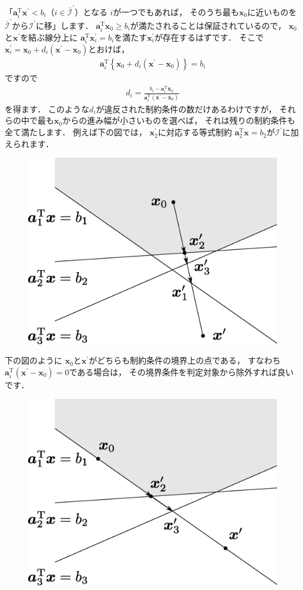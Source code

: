 ﻿\documentclass{jsarticle}
\begin{document}
「$\boldsymbol{a}_{i}^{\mathrm{T}}\boldsymbol{x}^{\prime}<b_{i}$（$i\in\bar{\mathcal{I}}^{\prime}$）となる
$i$が一つでもあれば，
そのうち最も$\boldsymbol{x}_{0}$に近いものを$\bar{\mathcal{I}}^{\prime}$から$\mathcal{I}^{\prime}$に移」します．
$\boldsymbol{a}_{i}^{\mathrm{T}}\boldsymbol{x}_{0}\geq b_{i}$が満たされることは保証されているので，
$\boldsymbol{x}_{0}$と$\boldsymbol{x}^{\prime}$を結ぶ線分上に
$\boldsymbol{a}_{i}^{\mathrm{T}}\boldsymbol{x}_{i}^{\prime}=b_{i}$を満たす$\boldsymbol{x}_{i}^{\prime}$が存在するはずです．
そこで
$\boldsymbol{x}_{i}^{\prime}=\boldsymbol{x}_{0}+d_{i}(\boldsymbol{x}^{\prime}-\boldsymbol{x}_{0})$とおけば，
\begin{align*}
\boldsymbol{a}_{i}^{\mathrm{T}}\left\{\boldsymbol{x}_{0}+d_{i}(\boldsymbol{x}^{\prime}-\boldsymbol{x}_{0})\right\}=b_{i}
\end{align*}
ですので
\begin{align*}
d_{i}=\frac{b_{i}-\boldsymbol{a}_{i}^{\mathrm{T}}\boldsymbol{x}_{0}}{\boldsymbol{a}_{i}^{\mathrm{T}}(\boldsymbol{x}^{\prime}-\boldsymbol{x}_{0})}
\end{align*}
を得ます．
このような$d_{i}$が違反された制約条件の数だけあるわけですが，
それらの中で最も$\boldsymbol{x}_{0}$からの進み幅が小さいものを選べば，
それは残りの制約条件も全て満たします．
例えば下の図では，
$\boldsymbol{x}_{2}^{\prime}$に対応する等式制約
$\boldsymbol{a}_{2}^{\mathrm{T}}\boldsymbol{x}=b_{2}$が$\mathcal{I}^{\prime}$に加えられます．
\begin{figure}[h]
\begin{center}
\includegraphics[width=.5\textwidth]{fig/active_set_add.eps}
\end{center}
\end{figure}

下の図のように
$\boldsymbol{x}_{0}$と$\boldsymbol{x}^{\prime}$がどちらも制約条件の境界上の点である，
すなわち$\boldsymbol{a}_{i}^{\mathrm{T}}(\boldsymbol{x}^{\prime}-\boldsymbol{x}_{0})=0$である場合は，
その境界条件を判定対象から除外すれば良いです．
\begin{figure}[h]
\begin{center}
\includegraphics[width=.5\textwidth]{fig/active_set_add_deg.eps}
\end{center}
\end{figure}
\end{document}
